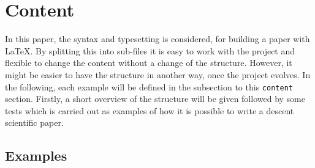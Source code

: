 \section{Content}
In this paper, the syntax and typesetting is considered, for building a paper with \LaTeX. By splitting this into sub-files it is easy to work with the project and flexible to change the content without a change of the structure. However, it might be easier to have the structure in another way, once the project evolves. In the following, each example will be defined in the subsection to this \texttt{content} section. Firstly, a short overview of the structure will be given followed by some tests which is carried out as examples of how it is possible to write a descent scientific paper.
%

%
\subsection{Examples}
\label{sec:examples}
%

%

%
%
%
%
%
%
%
%
%
%
%
%
%
% 
